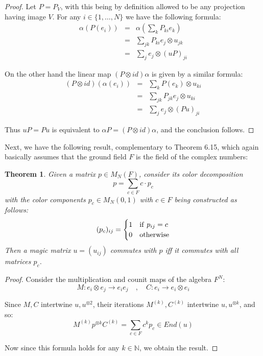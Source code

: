 \documentclass[12pt]{amsbook}
\newtheorem{theorem}{Theorem}[chapter]
\begin{document}
\begin{proof}
Let $P=P_V$, with this being by definition allowed to be any projection having image $V$. For any $i\in\{1,\ldots,N\}$ we have the following formula:
\begin{eqnarray*}
\alpha(P(e_i))
&=&\alpha\left(\sum_kP_{ki}e_k\right)\\
&=&\sum_{jk}P_{ki}e_j\otimes u_{jk}\\
&=&\sum_je_j\otimes (uP)_{ji}
\end{eqnarray*}

On the other hand the linear map $(P\otimes id)\alpha$ is given by a similar formula:
\begin{eqnarray*}
(P\otimes id)(\alpha(e_i))
&=&\sum_kP(e_k)\otimes u_{ki}\\
&=&\sum_{jk}P_{jk}e_j\otimes u_{ki}\\
&=&\sum_je_j\otimes (Pu)_{ji}
\end{eqnarray*}

Thus $uP=Pu$ is equivalent to $\alpha P=(P\otimes id)\alpha$, and the conclusion follows.
\end{proof}

Next, we have the following result, complementary to Theorem 6.15, which again basically assumes that the ground field $F$ is the field of the complex numbers:


\begin{theorem}
Given a matrix $p\in M_N(F)$, consider its color decomposition
$$p=\sum_{c\in F}c\cdot p_c$$
with the color components $p_c\in M_N(0,1)$ with $c\in F$ being constructed as follows:
$$(p_c)_{ij}=\begin{cases}
1&{\rm if}\ p_{ij}=c\\
0&{\rm otherwise}
\end{cases}$$
Then a magic matrix $u=(u_{ij})$ commutes with $p$ iff it commutes with all matrices $p_c$.
\end{theorem}

\begin{proof}
Consider the multiplication and counit maps of the algebra $F^N$:
$$M:e_i\otimes e_j\to e_ie_j\quad,\quad 
C:e_i\to e_i\otimes e_i$$

Since $M,C$ intertwine $u,u^{\otimes 2}$, their iterations $M^{(k)},C^{(k)}$ intertwine $u,u^{\otimes k}$, and so:
$$M^{(k)}p^{\otimes k}C^{(k)}
=\sum_{c\in F}c^kp_c
\in End(u)$$

Now since this formula holds for any $k\in\mathbb N$, we obtain the result.
\end{proof}
\end{document}
